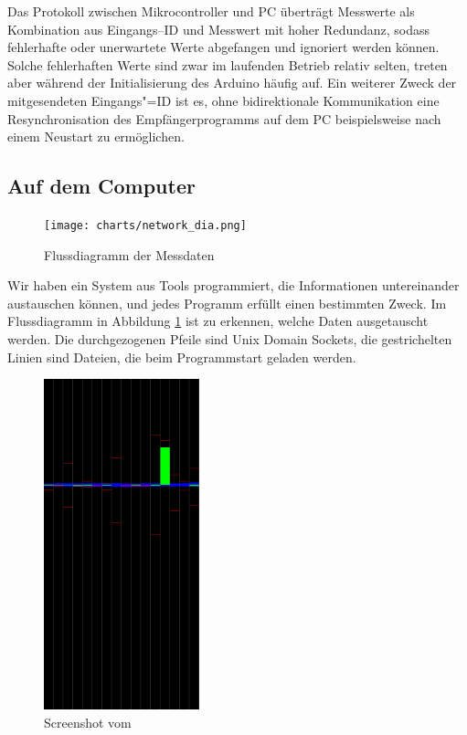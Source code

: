 Das Protokoll zwischen Mikrocontroller und PC überträgt Messwerte als Kombination aus
Eingangs--ID und Messwert mit hoher Redundanz, sodass fehlerhafte oder
unerwartete Werte abgefangen und
ignoriert werden können. Solche fehlerhaften Werte sind zwar im laufenden Betrieb relativ selten,
treten aber während der Initialisierung des Arduino häufig auf. Ein weiterer Zweck der
mitgesendeten Eingangs"=ID ist es, ohne bidirektionale Kommunikation eine Resynchronisation des
Empfängerprogramms auf dem PC beispielsweise nach einem Neustart zu ermöglichen.

\subsection{Auf dem Computer}

\begin{figure}
  \texttt{[image: charts/network\_dia.png]}
  \caption{Flussdiagramm der Messdaten}
  \label{fig:network}
\end{figure}

Wir haben ein System aus Tools programmiert, die Informationen untereinander austauschen können, und jedes Programm erfüllt einen bestimmten Zweck.
Im Flussdiagramm in Abbildung \ref{fig:network} ist zu erkennen, welche Daten ausgetauscht werden.
Die durchgezogenen Pfeile sind Unix Domain Sockets, die gestrichelten Linien sind Dateien, die beim Programmstart geladen werden.

\begin{figure}
  \includegraphics[width=0.4\textwidth]{images/rangetester.png}
  \caption{Screenshot vom }
  \label{fig:screenrangetester}
\end{figure}

